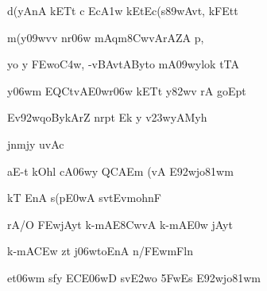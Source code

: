 \dnnemslokad 
{\dn d\4(yAnA\2 kETt\2 c Ec\3A1w kEtEc(s\389wAvt, kFEt\0t \vegdn\dontdisplaylinenum}


\ujvers\dnnemsloka 
{\dn m(y\?{\qvb}\309wv\?v nr\?\306w mAqm\38Cw\?vArAZA\2 p,}
\dontdisplaylinenum

\dnnemslokab 
{\dn yo y\2 \3FEwo\3C4w, -vBAvtAByto mA\309wylok\? tTA \dandadn\dontdisplaylinenum}

\dnnemslokac 
{\dn y\306wm\? EQCtvA\3E0wr\?\306w kETt\2 y\382wv\2 rA goEpt}
\dontdisplaylinenum

\dnnemslokad 
{\dn Ev\392w\?qoBykArZ\2 nrpt\? Ek\2 y v\323wyAMyh \vegdn\dontdisplaylinenum}




\dnvers

{\dn jnm\?jy uvAc{\dandabdn}\dontdisplaylinenum }

{\dn aE-t kOhl\2 cA\306wy\2 QCAEm (vA\2 E\392wjo\381wm{\dandadn} \dontdisplaylinenum}

{\dn kT\2 EnA s(p\3E0wA sv\0tEvmohnF \vegdn\dontdisplaylinenum}

{\dn rA/O \3FEwjAyt\? k-mAE\38CwvA k-mA\3E0w jAyt\?{\dandabdn} \dontdisplaylinenum}

{\dn k-mA\3CEw zt\? j\306wtoEn\0A n\?/\3FEwmFln\dontdisplaylinenum }

{\dn et\306wm\? s\2fy\2 ECE\306wD sv\0\3E2wo \35FwEs E\392wjo\381wm \vegdn\dontdisplaylinenum}

